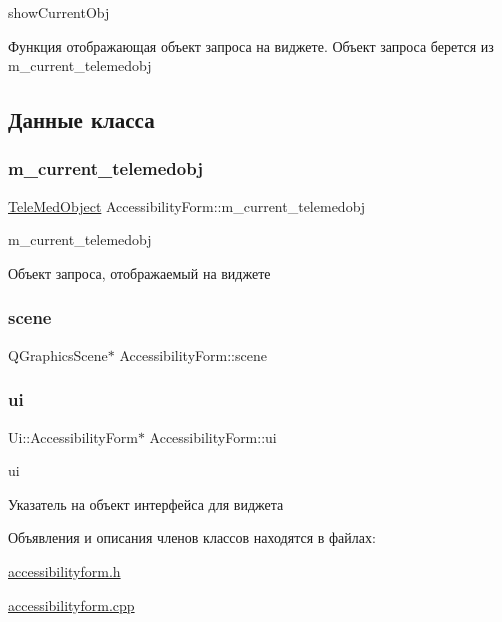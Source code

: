 show\+Current\+Obj 

Функция отображающая объект запроса на виджете. Объект запроса берется из m\+\_\+current\+\_\+telemedobj 

\subsection{Данные класса}
\mbox{\label{classAccessibilityForm_a7abf8a65145b6a1164e15fe5667156ab}} 
\subsubsection{\texorpdfstring{m\+\_\+current\+\_\+telemedobj}{m\_current\_telemedobj}}
{\footnotesize\ttfamily \hyperlink{classTeleMedObject}{Tele\+Med\+Object} Accessibility\+Form\+::m\+\_\+current\+\_\+telemedobj\hspace{0.3cm}{\ttfamily [private]}}



m\+\_\+current\+\_\+telemedobj 

Объект запроса, отображаемый на виджете \mbox{\label{classAccessibilityForm_a5ce983d3b40e1486857d263b11fda575}} 
\subsubsection{\texorpdfstring{scene}{scene}}
{\footnotesize\ttfamily Q\+Graphics\+Scene$\ast$ Accessibility\+Form\+::scene}

\mbox{\label{classAccessibilityForm_a410e78e46d46b2e5785277eba28fc8de}} 
\subsubsection{\texorpdfstring{ui}{ui}}
{\footnotesize\ttfamily Ui\+::\+Accessibility\+Form$\ast$ Accessibility\+Form\+::ui\hspace{0.3cm}{\ttfamily [private]}}



ui 

Указатель на объект интерфейса для виджета 

Объявления и описания членов классов находятся в файлах\+:\begin{DoxyCompactItemize}
\item 
\hyperlink{accessibilityform_8h}{accessibilityform.\+h}\item 
\hyperlink{accessibilityform_8cpp}{accessibilityform.\+cpp}\end{DoxyCompactItemize}
